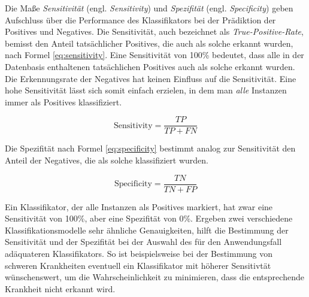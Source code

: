 Die Maße \emph{Sensitivität} (engl. \emph{Sensitivity}) und  \emph{Spezifität} (engl. \emph{Specificity}) geben Aufschluss über die Performance des Klassifikators bei der Prädiktion der Positives und Negatives. Die Sensitivität, auch bezeichnet als \emph{True-Positive-Rate}, bemisst den Anteil tatsächlicher Positives, die auch als solche erkannt wurden, nach Formel \ref{eq:sensitivity}. Eine Sensitivität von 100\% bedeutet, dass alle in der Datenbasis enthaltenen tatsächlichen Positives auch als solche erkannt  wurden. Die Erkennungsrate der Negatives hat keinen Einfluss auf die Sensitivität. Eine hohe Sensitivität lässt sich somit \glqq einfach\grqq{} erzielen, in dem man \emph{alle} Instanzen immer als Positives klassifiziert.\cite[S. 222]{machine_kubat}

\begin{equation}
\text{Sensitivity} = \frac{TP}{TP+FN}
\label{eq:sensitivity}
\end{equation}

Die Spezifität nach Formel \ref{eq:specificity} bestimmt analog zur Sensitivität den Anteil der Negatives, die als solche klassifiziert wurden. 

\begin{equation}
\text{Specificity} = \frac{TN}{TN+FP}
\label{eq:specificity}
\end{equation}

Ein Klassifikator, der alle Instanzen als Positives markiert, hat zwar eine Sensitivität von 100\%, aber eine Spezifität von 0\%. Ergeben zwei verschiedene Klassifikationsmodelle sehr ähnliche Genauigkeiten, hilft die Bestimmung der Sensitivität und der Spezifität bei der Auswahl des für den Anwendungsfall adäquateren Klassifikators. So ist beispielsweise bei der Bestimmung von schweren Krankheiten eventuell ein Klassifikator mit höherer Sensitivtät wünschenswert, um die Wahrscheinlichkeit zu minimieren, dass die entsprechende Krankheit nicht erkannt wird. \cite{sens-and_spec}  \cite[S. 222]{machine_kubat}

